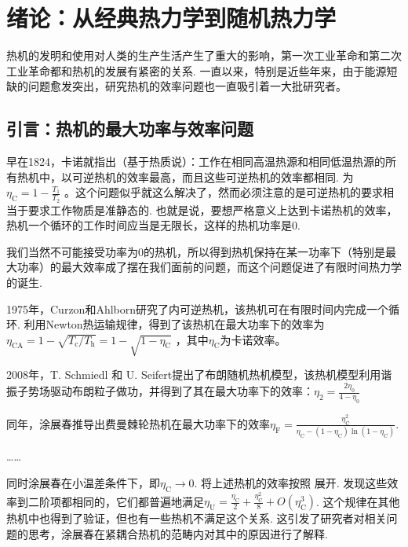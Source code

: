 \chapter{绪论：从经典热力学到随机热力学}
\label{c1}
热机的发明和使用对人类的生产生活产生了重大的影响，第一次工业革命和第二次工业革命都和热机的发展有紧密的关系. 一直以来，特别是近些年来，由于能源短缺的问题愈发突出，研究热机的效率问题也一直吸引着一大批研究者。

\section{引言：热机的最大功率与效率问题}
\quad 早在1824，卡诺就指出（基于热质说）\cite{2005}：工作在相同高温热源和相同低温热源的所有热机中，以可逆热机的效率最高，而且这些可逆热机的效率都相同. 为$\eta _{\text{C}}=1-\frac{T_1}{T_2}$ 。这个问题似乎就这么解决了，然而必须注意的是可逆热机的要求相当于要求工作物质是准静态的. 也就是说，要想严格意义上达到卡诺热机的效率，热机一个循环的工作时间应当是无限长，这样的热机功率是0.

我们当然不可能接受功率为0的热机，所以得到热机保持在某一功率下（特别是最大功率）的最大效率成了摆在我们面前的问题，而这个问题促进了有限时间热力学的诞生. 

1975年，Curzon和Ahlborn研究了内可逆热机\cite{Curzon1975}，该热机可在有限时间内完成一个循环. 利用Newton热运输规律，得到了该热机在最大功率下的效率为$\eta _{\mathrm{CA}}=1-\sqrt{T_{\mathrm{c}}/T_{\mathrm{h}}}=1-\sqrt{1-\eta _{\mathrm{C}}}$ ，其中$\eta _{\mathrm{C}}$为卡诺效率。

2008年，T. Schmiedl 和 U. Seifert提出了布朗随机热机模型\cite{Schmiedl2008}，该热机模型利用谐振子势场驱动布朗粒子做功，并得到了其在最大功率下的效率：$\eta_{2}=\frac{2 \eta_{0}}{4-\eta_{0}}$

同年，涂展春推导出费曼棘轮热机\cite{Tu2008}在最大功率下的效率$\eta _{\text{F}}=\frac{\eta _{\text{C}}^{2}}{\eta _{\text{C}}-\left( 1-\eta _{\text{C}} \right) \ln \left( 1-\eta _{\text{C}} \right)}$. \cite{Tu2020}

……



同时涂展春\cite{Tu2008}在小温差条件下，即$\eta _{\text{C}}\rightarrow 0$. 将上述热机的效率按照 展开. 发现这些效率到二阶项都相同的，它们都普遍地满足$\eta _{\text{U}}=\frac{\eta _{\text{C}}}{2}+\frac{\eta _{\text{C}}^{2}}{8}+O\left( \eta _{\text{C}}^{3} \right)$. 这个规律在其他热机中也得到了验证，但也有一些热机不满足这个关系. 这引发了研究者对相关问题的思考，涂展春在紧耦合热机的范畴内对其中的原因进行了解释.\cite{Tu2020}

